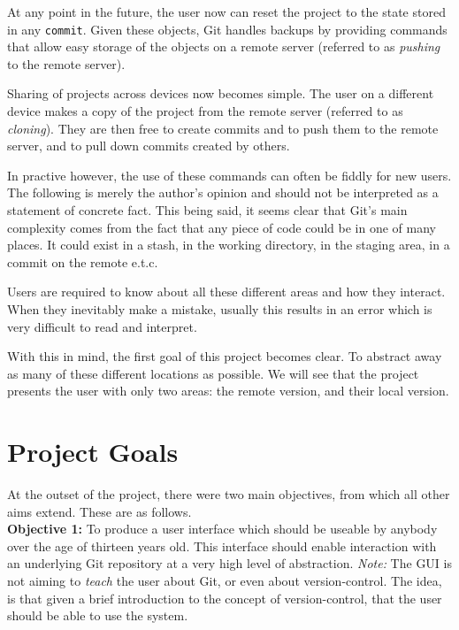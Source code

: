 At any point in the future, the user now can reset the project to the state stored in any \texttt{commit}. Given these objects, Git handles backups by providing commands that allow easy storage of the objects on a remote server (referred to as \emph{pushing} to the remote server). 

Sharing of projects across devices now becomes simple. The user on a different device makes a copy of the project from the remote server (referred to as \emph{cloning}). They are then free to create commits and to push them to the remote server, and to pull down commits created by others.

In practive however, the use of these commands can often be fiddly for new users.  The following is merely the author's opinion and should not be interpreted as a statement of concrete fact. This being said, it seems clear that Git's main complexity comes from the fact that any piece of code could be in one of many places. It could exist in a stash, in the working directory, in the staging area, in a commit on the remote e.t.c.

Users are required to know about all these different areas and how they interact. When they inevitably make a mistake, usually this results in an error which is very difficult to read and interpret. 

With this in mind, the first goal of this project becomes clear. To abstract away as many of these different locations as possible. We will see that the project presents the user with only two areas: the remote version, and their local version.

\section{Project Goals}\label{sec:projectgoals}

At the outset of the project, there were two main objectives, from which all other aims extend. These are as follows.\\

\noindent \textbf{Objective 1:} To produce a user interface which should be useable by anybody over the age of thirteen years old. This interface should enable interaction with an underlying Git repository at a very high level of abstraction. \emph{Note:} The GUI is not aiming to \emph{teach} the user about Git, or even about version-control. The idea, is that given a brief introduction to the concept of version-control, that the user should be able to use the system.

